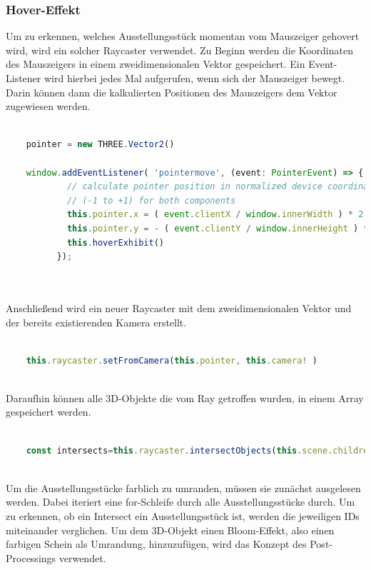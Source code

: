 \subsubsection{Hover-Effekt}
Um zu erkennen, welches Ausstellungsstück momentan vom Mauszeiger gehovert wird, wird ein solcher Raycaster verwendet. Zu Beginn werden die Koordinaten des Mauszeigers in einem zweidimensionalen Vektor gespeichert. Ein Event-Listener wird hierbei jedes Mal aufgerufen, wenn sich der Mauszeiger bewegt. Darin können dann die kalkulierten Positionen des Mauszeigers dem Vektor zugewiesen werden.

\begin{lstlisting}[caption={Aktuelle Koordinaten des Mauszeigers einem 2D-Vektor zuweisen},language=TypeScript]
    
    pointer = new THREE.Vector2()

    window.addEventListener( 'pointermove', (event: PointerEvent) => {
            // calculate pointer position in normalized device coordinates
            // (-1 to +1) for both components
            this.pointer.x = ( event.clientX / window.innerWidth ) * 2 - 1
            this.pointer.y = - ( event.clientY / window.innerHeight ) * 2 + 1
            this.hoverExhibit()
          });
    
    
        \end{lstlisting}

Anschließend wird ein neuer Raycaster mit dem zweidimensionalen Vektor und der bereits existierenden Kamera erstellt. 

\begin{lstlisting}[caption={Neuen Raycaster anlegen},language=TypeScript]
    
    this.raycaster.setFromCamera(this.pointer, this.camera! )
    
\end{lstlisting}

Daraufhin können alle 3D-Objekte die vom Ray getroffen wurden, in einem Array gespeichert werden.

\begin{lstlisting}[caption={Intersected Objects auslesen},language=TypeScript]
    
    const intersects=this.raycaster.intersectObjects(this.scene.children)
    
\end{lstlisting}

Um die Ausstellungsstücke farblich zu umranden, müssen sie zunächst ausgelesen werden. Dabei iteriert eine for-Schleife durch alle Ausstellungsstücke durch. Um zu erkennen, ob ein Intersect ein Ausstellungsstück ist, werden die jeweiligen IDs miteinander verglichen. Um dem 3D-Objekt einen Bloom-Effekt, also einen farbigen Schein als Umrandung, hinzuzufügen, wird das Konzept des Post-Processings verwendet.

